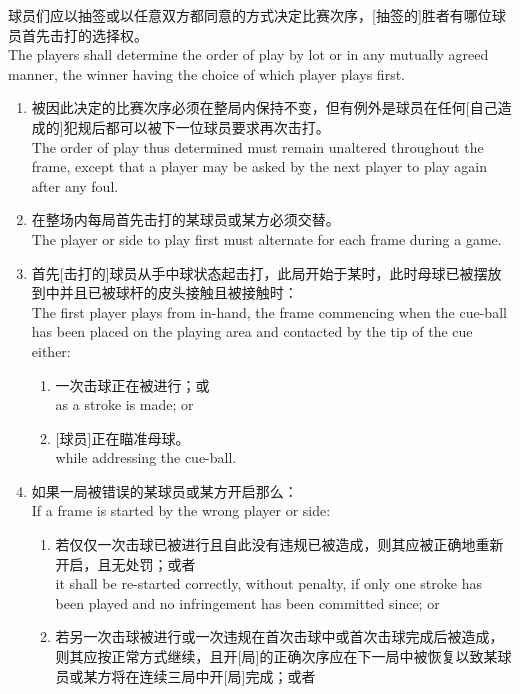 \noindent 球员们应以抽签或以任意双方都同意的方式决定比赛次序，[抽签的]胜者有哪位球员首先击打的选择权。\\
The players shall determine the order of play by lot or in any mutually agreed manner, the winner having the choice of which player plays first.
\begin{enumerate}[label=(\alph*)]
    \item 被因此决定的比赛次序必须在整局内保持不变，但有例外是球员在任何[自己造成的]犯规后都可以被下一位球员要求再次击打。\\
    The order of play thus determined must remain unaltered throughout the frame, except that a player may be asked by the next player to play again after any foul.
    \item 在整场内每局首先击打的某球员或某方必须交替。\\
    The player or side to play first must alternate for each frame during a game.
    \item \label{2233c}首先[击打的]球员从手中球状态起击打，此局开始于某时，此时母球已被摆放到\playingarea{}中并且已被球杆的皮头接触且被接触时：\\
    The first player plays from in-hand, the frame commencing when the cue-ball has been placed on the playing area and contacted by the tip of the cue either:
    \begin{enumerate}[label=(\roman*)]
        \item 一次击球正在被进行；或\\
        as a stroke is made; or
        \item ${}$[球员]正在瞄准母球。\\
        while addressing the cue-ball.
    \end{enumerate}
    \item \label{2233d}如果一局被错误的某球员或某方开启那么：\\
    If a frame is started by the wrong player or side:
    \begin{enumerate}[label=(\roman*)]
        \item 若仅仅一次击球已被进行且自此没有违规已被造成，则其应被正确地重新开启，且无处罚；或者\\
        it shall be re-started correctly, without penalty, if only one stroke has been played and no infringement has been committed since; or
        \item 若另一次击球被进行或一次违规在首次击球中或首次击球完成后被造成，则其应按正常方式继续，且开[局]的正确次序应在下一局中被恢复以致某球员或某方将在连续三局中开[局]完成；或者\\

\end{enumerate}
\end{enumerate}
